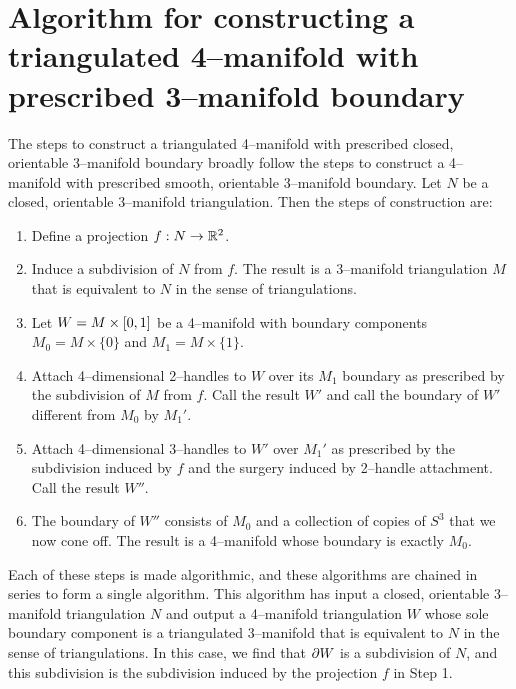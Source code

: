 \chapter[Triangulated]{Algorithm for constructing a triangulated 4--manifold with prescribed 3--manifold boundary}
\label{chapter:triangulation}

The steps to construct a triangulated 4--manifold with prescribed closed, orientable 3--manifold boundary broadly follow the steps to construct a 4--manifold with prescribed smooth, orientable 3--manifold boundary.
Let $N$ be a closed, orientable 3--manifold triangulation.
Then the steps of construction are:
\begin{enumerate}
	\item Define a projection $f:N\to\mathbb{R}^2$.
	
	\item Induce a subdivision of $N$ from $f$.  The result is a 3--manifold triangulation $M$ that is equivalent to $N$ in the sense of triangulations.

	\item Let $W=M\times[0,1]$ be a 4--manifold with boundary components $M_0 = M\times\{0\}$ and $M_1 = M\times\{1\}$.
	
	\item Attach 4--dimensional 2--handles to $W$ over its $M_1$ boundary as prescribed by the subdivision of $M$ from $f$.  Call the result $W'$ and call the boundary of $W'$ different from $M_0$ by $M_1'$.
	
	\item Attach 4--dimensional 3--handles to $W'$ over $M_1'$ as prescribed by the subdivision induced by $f$ and the surgery induced by 2--handle attachment.  Call the result $W''$.
	
	\item The boundary of $W''$ consists of $M_0$ and a collection of copies of $S^3$ that we now cone off.  The result is a 4--manifold whose boundary is exactly $M_0$.
\end{enumerate}

Each of these steps is made algorithmic, and these algorithms are chained in series to form a single algorithm.
This algorithm has input a closed, orientable 3--manifold triangulation $N$ and output a 4--manifold triangulation $W$ whose sole boundary component is a triangulated 3--manifold that is equivalent to $N$ in the sense of triangulations.
In this case, we find that $\partial W$ is a subdivision of $N$, and this subdivision is the subdivision induced by the projection $f$ in Step 1.

